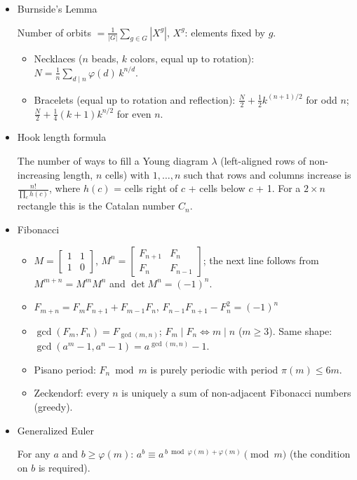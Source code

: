 \begin{itemize}
\item Burnside's Lemma

Number of orbits $= \frac{1}{|G|} \sum_{g \in G} |X^g|$, $X^g$: elements fixed by $g$.
\begin{itemize}
  \item Necklaces ($n$ beads, $k$ colors, equal up to rotation): $N = \frac 1 n \sum_{d \mid n} \varphi(d)\, k^{n/d}$.
  \item Bracelets (equal up to rotation and reflection): $\frac N 2 + \frac 1 2 k^{(n+1)/2}$ for odd $n$; $\frac N 2 + \frac 1 4 (k+1) k^{n/2}$ for even $n$.
\end{itemize}

\item Hook length formula

The number of ways to fill a Young diagram $\lambda$ (left-aligned rows of non-increasing length, $n$ cells) with $1, \ldots, n$ such that rows and columns increase is $\frac{n!}{\prod_{c} h(c)}$, where $h(c)$ = cells right of $c$ + cells below $c$ + 1. For a $2 \times n$ rectangle this is the Catalan number $C_n$.

\item Fibonacci

\begin{itemize}
  \item $M = \begin{bmatrix}1&1\\1&0\end{bmatrix}$, $M^n = \begin{bmatrix}F_{n+1}&F_n\\F_n&F_{n-1}\end{bmatrix}$; the next line follows from $M^{m+n} = M^m M^n$ and $\det M^n = (-1)^n$.
  \item $F_{m+n} = F_m F_{n+1} + F_{m-1} F_n$, \quad $F_{n-1}F_{n+1} - F_n^2 = (-1)^n$
  \item $\gcd(F_m, F_n) = F_{\gcd(m,n)}$; $F_m \mid F_n \iff m \mid n$ ($m \ge 3$). Same shape: $\gcd(a^m - 1, a^n - 1) = a^{\gcd(m,n)} - 1$.
  \item Pisano period: $F_n \bmod m$ is purely periodic with period $\pi(m) \le 6m$.
  \item Zeckendorf: every $n$ is uniquely a sum of non-adjacent Fibonacci numbers (greedy).
\end{itemize}

\item Generalized Euler

For any $a$ and $b \ge \varphi(m)$: $a^b \equiv a^{\,b \bmod \varphi(m) + \varphi(m)} \pmod m$ (the condition on $b$ is required).


\end{itemize}
